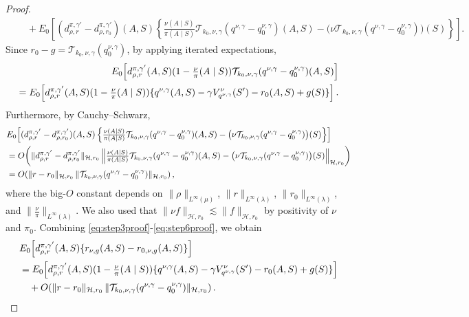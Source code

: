 \documentclass[11pt]{article}
\theoremstyle{plain}
\begin{document}
\begin{proof}
\begin{align}
&\quad + E_0\!\left[(d_{\rho,r}^{\pi,\gamma'} - d_{\rho,r_0}^{\pi,\gamma'})(A,S)\left\{\tfrac{\nu(A \mid S)}{\pi(A \mid S)}\mathcal{T}_{k_0,\nu,\gamma}(q^{\nu,\gamma} - q_0^{\nu,\gamma})(A,S) - \bigl(\nu\mathcal{T}_{k_0,\nu,\gamma}(q^{\nu,\gamma} - q_0^{\nu,\gamma})\bigr)(S)\right\}\right]. \label{eq:step4proof}
\end{align}
Since $r_0 - g = \mathcal{T}_{k_0,\nu,\gamma}(q_0^{\nu,\gamma})$, by applying iterated expectations,
\begin{align}
E_0\!\left[d_{\rho,r}^{\pi,\gamma'}(A,S)(1 - \tfrac{\nu}{\pi}(A \mid S))\mathcal{T}_{k_0,\nu,\gamma}(q^{\nu,\gamma} - q_0^{\nu,\gamma})(A,S)\right] \notag
\\
= E_0\!\left[d_{\rho,r}^{\pi,\gamma'}(A,S)(1 - \tfrac{\nu}{\pi}(A \mid S))\{q^{\nu,\gamma}(A,S) - \gamma V_{q^{\nu,\gamma}}^{\nu}(S') - r_0(A,S) + g(S)\}\right].
\label{eq:step5proof}
\end{align}
Furthermore, by Cauchy--Schwarz,
\begin{align}
& E_0\!\left[(d_{\rho,r}^{\pi,\gamma'} - d_{\rho,r_0}^{\pi,\gamma'})(A,S)\left\{\tfrac{\nu(A \mid S)}{\pi(A \mid S)}\mathcal{T}_{k_0,\nu,\gamma}(q^{\nu,\gamma} - q_0^{\nu,\gamma})(A,S) - \bigl(\nu\mathcal{T}_{k_0,\nu,\gamma}(q^{\nu,\gamma} - q_0^{\nu,\gamma})\bigr)(S)\right\}\right] \notag \\
&= O\!\left( \|d_{\rho,r}^{\pi,\gamma'} - d_{\rho,r_0}^{\pi,\gamma'}\|_{\mathcal{H},r_0} 
              \,\Bigl\| \tfrac{\nu(A \mid S)}{\pi(A \mid S)}\mathcal{T}_{k_0,\nu,\gamma}(q^{\nu,\gamma} - q_0^{\nu,\gamma})(A,S) - \bigl(\nu\mathcal{T}_{k_0,\nu,\gamma}(q^{\nu,\gamma} - q_0^{\nu,\gamma})\bigr)(S) \Bigr\|_{\mathcal{H},r_0} \right) \notag \\
&= O\!\left( \|r - r_0\|_{\mathcal{H},r_0} 
              \,\|\mathcal{T}_{k_0,\nu,\gamma}(q^{\nu,\gamma} - q_0^{\nu,\gamma})\|_{\mathcal{H},r_0} \right),
\label{eq:step6proof}
\end{align}
where the big-$O$ constant depends on $\|\rho\|_{L^\infty(\mu)}$, $\|r\|_{L^\infty(\lambda)}$, $\|r_0\|_{L^\infty(\lambda)}$, and $\|\tfrac{\nu}{\pi}\|_{L^\infty(\lambda)}$. We also used that $\|\nu f\|_{\mathcal{H},r_0} \lesssim \|f\|_{\mathcal{H},r_0}$ by positivity of $\nu$ and $\pi_0$.
Combining \eqref{eq:step3proof}-\eqref{eq:step6proof}, we obtain
\begin{align}
& E_0\!\left[d_{\rho,r}^{\pi,\gamma'}(A,S)\{r_{\nu,g}(A,S) - r_{0,\nu,g}(A,S)\}\right] \notag \\
&= E_0\!\left[d_{\rho,r}^{\pi,\gamma'}(A,S)(1 - \tfrac{\nu}{\pi}(A \mid S))\{q^{\nu,\gamma}(A,S) - \gamma V_{q^{\nu,\gamma}}^{\nu}(S') - r_0(A,S) + g(S)\}\right] \notag \\
&\quad + O\!\left( \|r - r_0\|_{\mathcal{H},r_0}\,\|\mathcal{T}_{k_0,\nu,\gamma}(q^{\nu,\gamma} - q_0^{\nu,\gamma})\|_{\mathcal{H},r_0} \right).
\label{eq:finaleqn2}
\end{align}



\end{proof}
\end{document}

